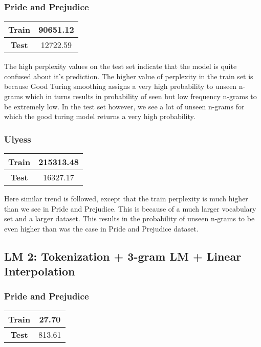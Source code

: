 \documentclass[a4paper,9pt]{report}
\begin{document}
\subsubsection*{Pride and Prejudice}
\begin{table}[H]
    \centering
    \begin{tabular}{|c|c|}
        \hline
        \textbf{Train} & {90651.12} \\
        \hline
        \textbf{Test} & {12722.59} \\
        \hline
    \end{tabular}
\end{table}
The high perplexity values on the test set indicate that the model is quite confused about it's prediction. The higher value of perplexity in the train set is because Good Turing smoothing assigns a very high probability to unseen n-grams which in turns results in probability of seen but low frequency n-grams to be extremely low. 
In the test set however, we see a lot of unseen n-grams for which the good turing model returns a very high probability.

\subsubsection*{Ulyess}
\begin{table}[H]
    \centering
    \begin{tabular}{|c|c|}
        \hline
        \textbf{Train} & {215313.48} \\
        \hline
        \textbf{Test} & {16327.17} \\
        \hline
    \end{tabular}
\end{table}
Here similar trend is followed, except that the train perplexity is much higher than we see in Pride and Prejudice. This is because of a much larger vocabulary set and a larger dataset. This results in the probability of unseen n-grams to be even higher than was the case in Pride and Prejudice dataset.

\subsection*{LM 2: Tokenization + 3-gram LM + Linear Interpolation}
\subsubsection*{Pride and Prejudice}
\begin{table}[H]
    \centering
    \begin{tabular}{|c|c|}
        \hline
        \textbf{Train} & {27.70} \\
        \hline
        \textbf{Test} & {813.61} \\
        \hline
    \end{tabular}
\end{table}
\end{document}
